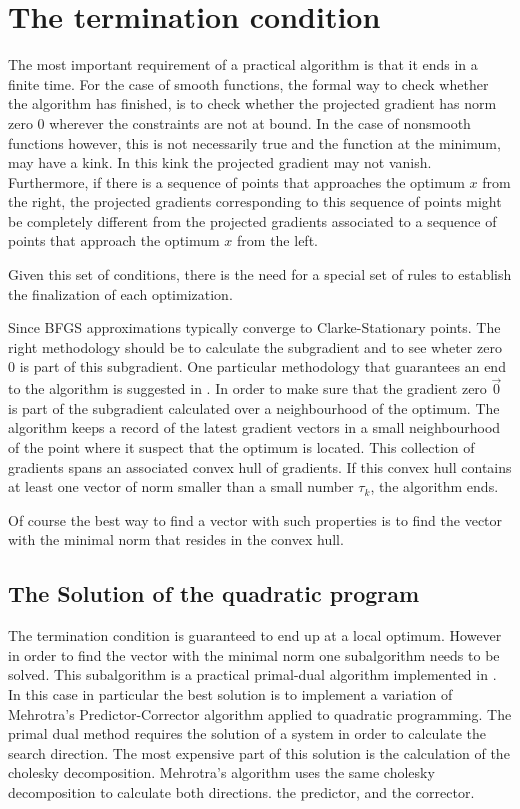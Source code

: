 \section{The termination condition}

The most important requirement of a practical algorithm is that it ends in a finite time. For the case of smooth functions, the formal way to check whether the algorithm has finished, is to check whether the projected gradient has norm zero $0$ wherever the constraints are not at bound. In the case of nonsmooth functions however, this is not necessarily true and the function at the minimum, may have a kink. In this kink the projected gradient may not vanish. Furthermore, if there is a sequence of points that approaches the optimum $x$ from the right, the projected gradients corresponding to this sequence of points might be completely different from the projected gradients associated to a sequence of points that approach the optimum $x$ from the left.

Given this set of conditions, there is the need for a special set of rules to establish the finalization of each optimization.

Since BFGS approximations typically converge to Clarke-Stationary points. The right methodology should be to calculate the subgradient and to see wheter zero $0$ is part of this subgradient. One particular methodology that guarantees an end to the algorithm is suggested in \citep{overtonlewis}. In order to make sure that the gradient zero $\vec{0}$ is part of the subgradient calculated over a neighbourhood of the optimum. The algorithm keeps a record of the latest gradient vectors in a small neighbourhood of the point where it suspect that the optimum is located. This collection of gradients spans an associated convex hull of gradients. If this convex hull contains at least one vector of norm smaller than a small number $\tau_k$, the algorithm ends.

Of course the best way to find a vector with such properties is to find the vector with the minimal norm that resides in the convex hull.

\subsection{The Solution of the quadratic program}

The termination condition is guaranteed to end up at a local optimum. However in order to find the vector with the minimal norm one subalgorithm needs to be solved. This subalgorithm is a practical primal-dual algorithm implemented in \citep{skaaja}. In this case in particular the best solution is to implement a variation of Mehrotra's Predictor-Corrector algorithm applied to quadratic programming. The primal dual method requires the solution of a system in order to calculate the search direction. The most expensive part of this solution is the calculation of the cholesky decomposition. Mehrotra's algorithm uses the same cholesky decomposition to calculate both directions. the predictor, and the corrector.

